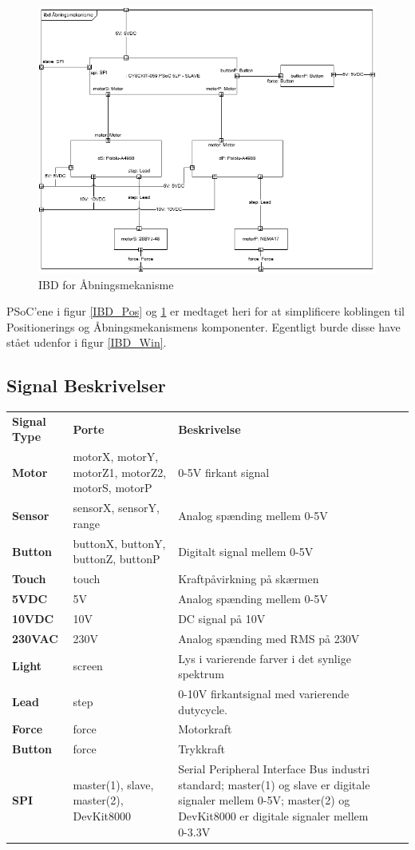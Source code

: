 \begin{figure}[H]
	\centering
	\includegraphics[scale=0.4]{IBD_Aab}
	\caption{IBD for Åbningsmekanisme}
	\label{IBD_Aab}
\end{figure}

PSoC'ene i figur \ref{IBD_Pos} og \ref{IBD_Aab} er medtaget heri for at simplificere koblingen til Positionerings og Åbningsmekanismens komponenter. Egentligt burde disse have stået udenfor i figur \ref{IBD_Win}.

\subsection{Signal Beskrivelser}

\begin{tabularx}{360pt}{>{\bfseries}p{50pt}  TX TX}
	Signal Type & \textbf{Porte} & \textbf{Beskrivelse} \\
	Motor & motorX, motorY, motorZ1, motorZ2, motorS, motorP & 0-5V firkant signal \\
	Sensor & sensorX, sensorY, range & Analog spænding mellem 0-5V \\
	Button & buttonX, buttonY, buttonZ, buttonP & Digitalt signal mellem 0-5V \\
	Touch & touch & Kraftpåvirkning på skærmen \\
	5VDC & 5V & Analog spænding mellem 0-5V \\
	10VDC & 10V & DC signal på 10V \\
	230VAC & 230V & Analog spænding med RMS på 230V \\
	Light & screen & Lys i varierende farver i det synlige spektrum \\
	Lead & step & 0-10V firkantsignal med varierende dutycycle. \\
	Force & force & Motorkraft \\
	Button & force & Trykkraft \\
	SPI & master(1), slave, master(2), DevKit8000 & Serial Peripheral Interface Bus industri standard; master(1) og slave er digitale signaler mellem 0-5V; master(2) og DevKit8000 er digitale signaler mellem 0-3.3V \\
\end{tabularx}